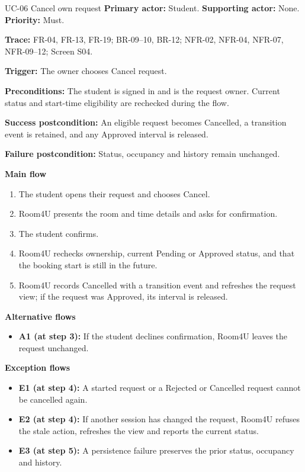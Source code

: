 \begin{usecasebox}{UC-06 Cancel own request}
\noindent\textbf{Primary actor:} Student.\quad
\textbf{Supporting actor:} None.\quad
\textbf{Priority:} Must.\par
\textbf{Trace:} FR-04, FR-13, FR-19; BR-09--10, BR-12; NFR-02, NFR-04, NFR-07, NFR-09--12; Screen S04.\par
\textbf{Trigger:} The owner chooses Cancel request.\par
\textbf{Preconditions:} The student is signed in and is the request owner. Current status and start-time eligibility are rechecked during the flow.\par
\textbf{Success postcondition:} An eligible request becomes Cancelled, a transition event is retained, and any Approved interval is released.\par
\textbf{Failure postcondition:} Status, occupancy and history remain unchanged.\par
\textbf{Main flow}
\begin{enumerate}[label=\arabic*.,leftmargin=2em,itemsep=1pt,topsep=2pt]
  \item The student opens their request and chooses Cancel.
  \item Room4U presents the room and time details and asks for confirmation.
  \item The student confirms.
  \item Room4U rechecks ownership, current Pending or Approved status, and that the booking start is still in the future.
  \item Room4U records Cancelled with a transition event and refreshes the request view; if the request was Approved, its interval is released.
\end{enumerate}
\textbf{Alternative flows}
\begin{itemize}[label={},leftmargin=0pt,itemsep=1pt,topsep=1pt]
  \item \textbf{A1 (at step 3):} If the student declines confirmation, Room4U leaves the request unchanged.
\end{itemize}
\textbf{Exception flows}
\begin{itemize}[label={},leftmargin=0pt,itemsep=1pt,topsep=1pt]
  \item \textbf{E1 (at step 4):} A started request or a Rejected or Cancelled request cannot be cancelled again.
  \item \textbf{E2 (at step 4):} If another session has changed the request, Room4U refuses the stale action, refreshes the view and reports the current status.
  \item \textbf{E3 (at step 5):} A persistence failure preserves the prior status, occupancy and history.
\end{itemize}
\end{usecasebox}

